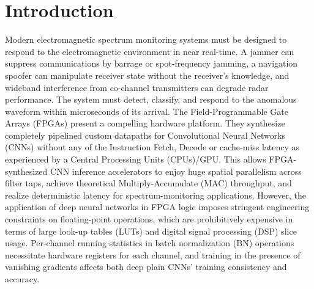 \documentclass[conference]{IEEEtran}
\begin{document}
\section{Introduction}

Modern electromagnetic spectrum monitoring systems must be designed to respond to the electromagnetic environment in near real-time. A jammer can suppress communications by barrage or spot-frequency jamming, a navigation spoofer can manipulate receiver state without the receiver's knowledge, and wideband interference from co-channel transmitters can degrade radar performance. The system must detect, classify, and respond to the anomalous waveform within microseconds of its arrival.
The Field-Programmable Gate Arrays (FPGAs) present a compelling hardware platform. They synthesize completely pipelined custom datapaths for Convolutional
Neural Networks (CNNs) without any of the Instruction Fetch, Decode or cache-miss latency as experienced by a Central
Processing Units (CPUs)/GPU. This allows FPGA-synthesized CNN inference accelerators to enjoy huge spatial parallelism across filter taps, achieve theoretical  Multiply-Accumulate (MAC) throughput, and realize deterministic latency for spectrum-monitoring applications.
However, the application of deep neural networks in FPGA logic imposes stringent engineering constraints on floating-point operations, which are prohibitively expensive in terms of large look-up tables (LUTs) and digital signal processing (DSP) slice usage. Per-channel running statistics in batch normalization (BN) operations necessitate hardware registers for each channel, and training in the presence of vanishing gradients affects both deep plain CNNs' training consistency and accuracy.
\end{document}
